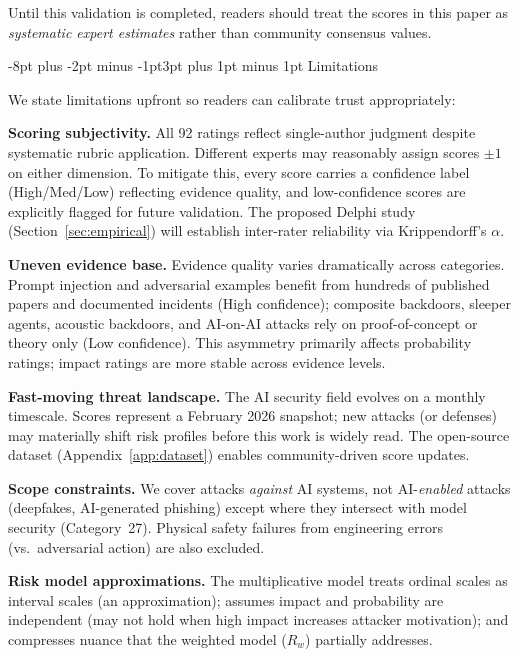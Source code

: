\documentclass[conference]{IEEEtran}
\makeatletter
\renewcommand{\subsection}{\@startsection{subsection}{2}{\z@}%
  {-8pt plus -2pt minus -1pt}{3pt plus 1pt minus 1pt}%
  {\normalfont\normalsize\bfseries\sffamily\color{accentblue}}}
\makeatother
\begin{document}
Until this validation is completed, readers should treat the scores in this paper as \textit{systematic expert estimates} rather than community consensus values.

\subsection{Limitations}\label{sec:limitations}

We state limitations upfront so readers can calibrate trust appropriately:

\textbf{Scoring subjectivity.} All 92 ratings reflect single-author judgment despite systematic rubric application. Different experts may reasonably assign scores $\pm1$ on either dimension. To mitigate this, every score carries a confidence label (High/Med/Low) reflecting evidence quality, and low-confidence scores are explicitly flagged for future validation. The proposed Delphi study (Section~\ref{sec:empirical}) will establish inter-rater reliability via Krippendorff's $\alpha$.

\textbf{Uneven evidence base.} Evidence quality varies dramatically across categories. Prompt injection and adversarial examples benefit from hundreds of published papers and documented incidents (High confidence); composite backdoors, sleeper agents, acoustic backdoors, and AI-on-AI attacks rely on proof-of-concept or theory only (Low confidence). This asymmetry primarily affects probability ratings; impact ratings are more stable across evidence levels.

\textbf{Fast-moving threat landscape.} The AI security field evolves on a monthly timescale. Scores represent a February 2026 snapshot; new attacks (or defenses) may materially shift risk profiles before this work is widely read. The open-source dataset (Appendix~\ref{app:dataset}) enables community-driven score updates.

\textbf{Scope constraints.} We cover attacks \emph{against} AI systems, not AI-\emph{enabled} attacks (deepfakes, AI-generated phishing) except where they intersect with model security (Category~27). Physical safety failures from engineering errors (vs.\ adversarial action) are also excluded.

\textbf{Risk model approximations.} The multiplicative model treats ordinal scales as interval scales (an approximation); assumes impact and probability are independent (may not hold when high impact increases attacker motivation); and compresses nuance that the weighted model ($R_w$) partially addresses.
\end{document}
